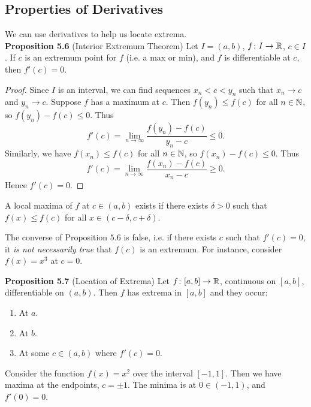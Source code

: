 \documentclass[class=article, crop=false]{standalone}
\begin{document}
  \subsection{Properties of Derivatives}
  We can use derivatives to help us locate extrema. \\
  \textbf{Proposition 5.6} (Interior Extremum Theorem) Let $I = (a, b)$, $f\colon I\to \mathbb{R}$, $c\in I$. If $c$ is an extremum point for $f$ (i.e. a max or min), and $f$ is differentiable at $c$, then $f'(c) = 0$.
  \begin{proof}
    Since $I$ is an interval, we can find sequences $x_n < c < y_n$ such that $x_n\to c$ and $y_n\to c$. Suppose $f$ has a maximum at $c$. Then $f(y_n)\leq f(c)$ for all $n\in\mathbb{N}$, so $f(y_n) - f(c)\leq 0$. Thus
    \[
      f'(c) = \lim_{n\to \infty} \frac{f(y_n) - f(c)}{y_n - c} \leq 0.
    \]
    Similarly, we have $f(x_n)\leq f(c)$ for all $n\in \mathbb{N}$, so $f(x_n) - f(c)\leq 0$. Thus
    \[
      f'(c) = \lim_{n\to \infty} \frac{f(x_n) - f(c)}{x_n - c} \geq 0.
    \]
    Hence $f'(c) = 0$.
  \end{proof}
  \begin{note}{}
    A local maxima of $f$ at $c\in (a, b)$ exists if there exists $\delta > 0$ such that $f(x)\leq f(c)$ for all $x\in (c - \delta, c + \delta)$.
  \end{note}
  \begin{note}{}
    The converse of Proposition $5.6$ is false, i.e. if there exists $c$ such that $f'(c) = 0$, it \emph{is not necessarily true} that $f(c)$ is an extremum. For instance, consider $f(x) = x^3$ at $c = 0$.
  \end{note}
  \newpage
  \textbf{Proposition 5.7} (Location of Extrema) Let $f\colon [a, b]\to \mathbb{R}$, continuous on $[a, b]$, differentiable on $(a, b)$. Then $f$ has extrema in $[a, b]$ and they occur:
  \begin{enumerate}[label=(\roman*)]
    \item At $a$.
    \item At $b$.
    \item At some $c\in (a, b)$ where $f'(c) = 0$.
  \end{enumerate}
  \begin{example}{}
    Consider the function $f(x) = x^2$ over the interval $[-1, 1]$. Then we have maxima at the endpoints, $c=\pm 1$. The minima is at $0\in (-1, 1)$, and $f'(0) = 0$.
  \end{example}
\end{document}
